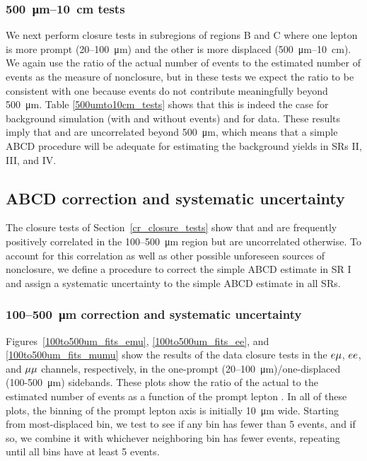 \subsubsection{\SI{500}{\um}--\SI{10}{\cm} tests}
We next perform closure tests in subregions of regions B and C where one lepton is more prompt (\num{20}--\SI{100}{\um}) and the other is more displaced (\SI{500}{\um}--\SI{10}{\cm}). We again use the ratio of the actual number of events to the estimated number of events as the measure of nonclosure, but in these tests we expect the ratio to be consistent with one because \ztautaull events do not contribute meaningfully beyond \SI{500}{\um}. Table \ref{500umto10cm_tests} shows that this is indeed the case for background simulation (with and without \ztautaull events) and for data. These results imply that \ada and \adb are uncorrelated beyond \SI{500}{\um}, which means that a simple ABCD procedure will be adequate for estimating the background yields in SRs II, III, and IV.



\subsection{ABCD correction and systematic uncertainty}
\label{abcd_correction}
The closure tests of Section~\ref{cr_closure_tests} show that \ada and \adb are frequently positively correlated in the \num{100}--\SI{500}{\um} region but are uncorrelated otherwise. To account for this correlation as well as other possible unforeseen sources of nonclosure, we define a procedure to correct the simple ABCD estimate in SR I and assign a systematic uncertainty to the simple ABCD estimate in all SRs.

\subsubsection{\num{100}--\SI{500}{\um} correction and systematic uncertainty}
Figures~\ref{100to500um_fits_emu}, \ref{100to500um_fits_ee}, and \ref{100to500um_fits_mumu} show the results of the data closure tests in the $e{\mu}$, $ee$, and ${\mu}{\mu}$ channels, respectively, in the one-prompt (\num{20}--\SI{100}{\um})/one-displaced (\num{100}-\SI{500}{\um}) sidebands. These plots show the ratio of the actual to the estimated number of events as a function of the prompt lepton \ad. In all of these plots, the binning of the prompt lepton axis is initially \SI{10}{\um} wide. Starting from most-displaced bin, we test to see if any bin has fewer than 5 events, and if so, we combine it with whichever neighboring bin has fewer events, repeating until all bins have at least 5 events.

